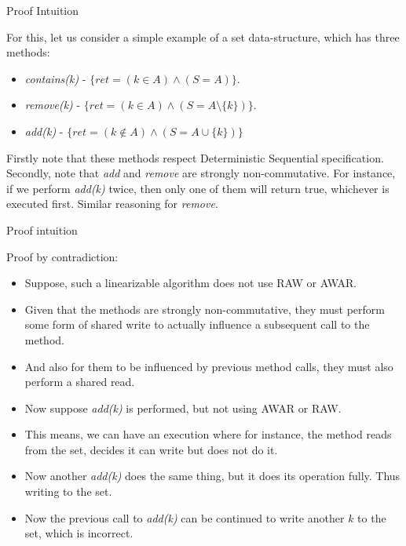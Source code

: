 \documentclass[notes, xcolor=dvipsnames]{beamer}
\begin{document}
    \begin{frame}{Proof Intuition}

        For this, let us consider a simple example of a set data-structure, which has three methods: 
        \begin{itemize}
            \item \textit{contains(k)} - $\{ ret = (k \in A) \wedge (S=A) \}$.
            \item \textit{remove(k)} - $\{ ret = (k \in A) \wedge (S=A \setminus \{k\}) \}$.
            \item \textit{add(k)} - $\{ ret = (k \notin A) \wedge (S=A \cup \{k\}) \}$
        \end{itemize}

        Firstly note that these methods respect Deterministic Sequential specification. 
        Secondly, note that \textit{add} and \textit{remove} are strongly non-commutative. 
        For instance, if we perform \textit{add(k)} twice, then only one of them will return true, whichever is executed first. 
        Similar reasoning for \textit{remove}.

    \end{frame}

    \begin{frame}{Proof intuition}

        Proof by contradiction:
        \begin{itemize}
            \item Suppose, such a linearizable algorithm does not use RAW or AWAR. 
            \item Given that the methods are strongly non-commutative, they must perform some form of shared write to actually influence a subsequent call to the method. 
            \item And also for them to be influenced by previous method calls, they must also perform a shared read. 
        \end{itemize}

        \begin{itemize}
            \item Now suppose \textit{add(k)} is performed, but not using AWAR or RAW. 
            \item This means, we can have an execution where for instance, the method reads from the set, decides it can write but does not do it. 
            \item Now another \textit{add(k)} does the same thing, but it does its operation fully. Thus writing to the set.
            \item Now the previous call to \textit{add(k)} can be continued to write another $k$ to the set, which is incorrect. 
        \end{itemize}

    \end{frame}
    
\end{document}
